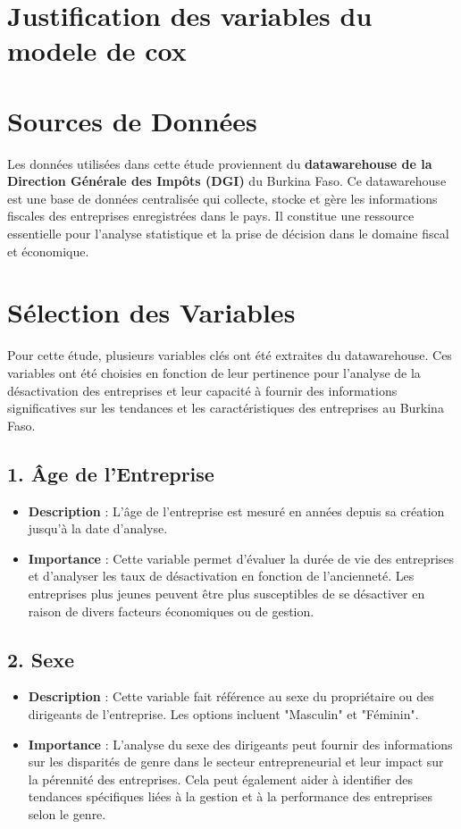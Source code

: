 \documentclass[a4paper,12pt]{report}
\begin{document}
\section{Justification des variables du modele de cox}

\section{Sources de Données}

Les données utilisées dans cette étude proviennent du \textbf{datawarehouse de la Direction Générale des Impôts (DGI)} du Burkina Faso. Ce datawarehouse est une base de données centralisée qui collecte, stocke et gère les informations fiscales des entreprises enregistrées dans le pays. Il constitue une ressource essentielle pour l’analyse statistique et la prise de décision dans le domaine fiscal et économique.

\section{Sélection des Variables}

Pour cette étude, plusieurs variables clés ont été extraites du datawarehouse. Ces variables ont été choisies en fonction de leur pertinence pour l’analyse de la désactivation des entreprises et leur capacité à fournir des informations significatives sur les tendances et les caractéristiques des entreprises au Burkina Faso.

\subsection{1. Âge de l’Entreprise}
\begin{itemize}
    \item \textbf{Description} : L'âge de l'entreprise est mesuré en années depuis sa création jusqu'à la date d'analyse.
    \item \textbf{Importance} : Cette variable permet d'évaluer la durée de vie des entreprises et d'analyser les taux de désactivation en fonction de l'ancienneté. Les entreprises plus jeunes peuvent être plus susceptibles de se désactiver en raison de divers facteurs économiques ou de gestion.
\end{itemize}

\subsection{2. Sexe}
\begin{itemize}
    \item \textbf{Description} : Cette variable fait référence au sexe du propriétaire ou des dirigeants de l'entreprise. Les options incluent "Masculin" et "Féminin".
    \item \textbf{Importance} : L'analyse du sexe des dirigeants peut fournir des informations sur les disparités de genre dans le secteur entrepreneurial et leur impact sur la pérennité des entreprises. Cela peut également aider à identifier des tendances spécifiques liées à la gestion et à la performance des entreprises selon le genre.
\end{itemize}
\end{document}
